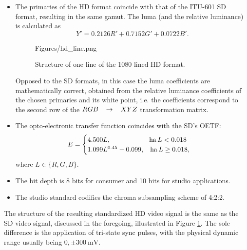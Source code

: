 \begin{itemize}
Due to the large data rate of progressive HD formats the ITU-709 has been extended with a lower spatial resolution format, containing 720 active lines and 1280 active pixels in a line, with exclusively progressive scanning mode.
\footnote{
As already discussed, the basic goal of 1080 lined format was to double the number of scan lines.
The line number of the 720p format---as an intermediate format between SD and HD---applies $\frac{3}{2} \cdot 480 = 720$ scan lines, with the horizontal number of pixels obtained from the aspect ratio of 16:9}.
It is denoted by: \textbf{720p}.
Two examples for the two basic HD formats can be seen in \ref{Fig:HD_formats}.
\item The primaries of the HD format coincide with that of the ITU-601 SD format, resulting in the same gamut.
The luma (and the relative luminance) is calculated as
\begin{equation}
Y' = 0.2126 R' + 0.7152 G' + 0.0722B'.
\end{equation}
\begin{figure}[]
	\centering
	\begin{overpic}[width = 1\columnwidth ]{Figures/hd_line.png}
	\end{overpic} 
	\caption{Structure of one line of the 1080 lined HD format.}
	\label{Fig:hd_line}
\end{figure}
Opposed to the SD formats, in this case the luma coefficients are mathematically correct, obtained from the relative luminance coefficients of the chosen primaries and its white point, i.e. the coefficients correspond to the second row of the $RGB \hspace{3mm} \rightarrow \hspace{3mm} XYZ$ transformation matrix.
\item The opto-electronic transfer function coincides with the SD's OETF:
\begin{equation}
E = 
\begin{cases}
4.500 L, \hspace{20mm} \mathrm{ha}\, L < 0.018 \\
1.099 L^{0.45} - 0.099, \hspace{3mm} \mathrm{ha}\, L \geq 0.018,
\end{cases}
\end{equation}
where $L \in \{ R, G, B \}$.
\item The bit depth is 8 bits for consumer and 10 bits for studio applications.
\item The studio standard codifies the chroma subsampling scheme of 4:2:2.
\end{itemize}
The structure of the resulting standardized HD video signal is the same as the SD video signal, discussed in the foregoing, illustrated in Figure \ref{Fig:hd_line}.
The sole difference is the application of tri-state sync pulses, with the physical dynamic range usually being $0, \pm300~\mathrm{mV}$.

